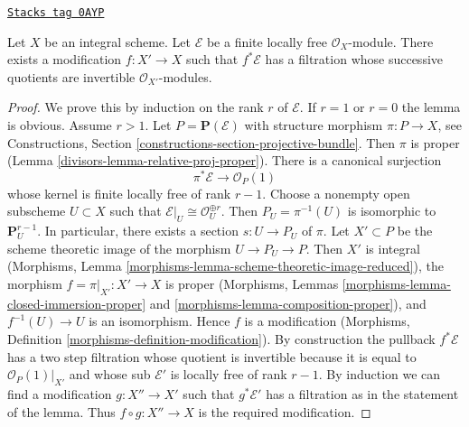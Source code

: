 \begin{lemma}
\label{divisors-lemma-filter-after-modification}
\href{https://stacks.math.columbia.edu/tag/0AYP}{\texttt{Stacks tag 0AYP}}

Let $X$ be an integral scheme. Let $\mathcal{E}$ be a finite locally free
$\mathcal{O}_X$-module. There exists a modification $f : X' \to X$
such that $f^*\mathcal{E}$ has a filtration whose successive quotients
are invertible $\mathcal{O}_{X'}$-modules.
\end{lemma}

\begin{proof}

We prove this by induction on the rank $r$ of $\mathcal{E}$.
If $r = 1$ or $r = 0$ the lemma is obvious. Assume $r > 1$.
Let $P = \mathbf{P}(\mathcal{E})$ with structure morphism $\pi : P \to X$,
see Constructions, Section \ref{constructions-section-projective-bundle}.
Then $\pi$ is proper (Lemma \ref{divisors-lemma-relative-proj-proper}).
There is a canonical surjection
$$
\pi^*\mathcal{E} \to \mathcal{O}_P(1)
$$
whose kernel is finite locally free of rank $r - 1$.
Choose a nonempty open subscheme $U \subset X$ such that
$\mathcal{E}|_U \cong \mathcal{O}_U^{\oplus r}$.
Then $P_U = \pi^{-1}(U)$ is isomorphic to $\mathbf{P}^{r - 1}_U$.
In particular, there exists a section $s : U \to P_U$ of $\pi$.
Let $X' \subset P$ be the scheme theoretic image of the
morphism $U \to P_U \to P$. Then $X'$ is integral
(Morphisms, Lemma \ref{morphisms-lemma-scheme-theoretic-image-reduced}),
the morphism $f = \pi|_{X'} : X' \to X$ is proper (Morphisms, Lemmas
\ref{morphisms-lemma-closed-immersion-proper} and
\ref{morphisms-lemma-composition-proper}), and
$f^{-1}(U) \to U$ is an isomorphism. Hence $f$ is a modification
(Morphisms, Definition \ref{morphisms-definition-modification}).
By construction the pullback $f^*\mathcal{E}$ has a two step
filtration whose quotient is invertible because it is equal to
$\mathcal{O}_P(1)|_{X'}$ and whose sub $\mathcal{E}'$ is locally free of rank
$r - 1$. By induction we can find a modification $g : X'' \to X'$
such that $g^*\mathcal{E}'$ has a filtration as in the statement of
the lemma. Thus $f \circ g : X'' \to X$ is the required modification.
\end{proof}

